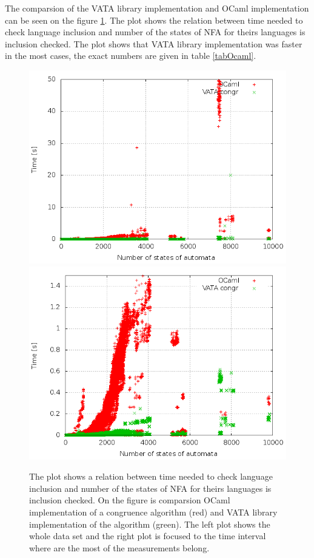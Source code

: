 The comparsion of the VATA library implementation and OCaml implementation can be seen on the figure \ref{figGraphOCaml}. The plot shows the relation between 
time needed to check language inclusion and number of the states of NFA for theirs languages is inclusion checked. The plot shows that VATA library
implementation was faster in the most cases, the exact numbers are given in table \ref{tabOcaml}.

\begin{figure}
\begin{center}
\includegraphics[scale=0.3]{fig/plot_hkc_zprava.png}
\includegraphics[scale=0.3]{fig/plot_hkc_step_zprava.png}
\label{figGraphOCaml}
\caption{The plot shows a relation between time needed to check language inclusion and number of the states of NFA for theirs languages is inclusion checked.
On the figure is comparsion OCaml implementation of a congruence algorithm (red) and VATA library implementation of the algorithm (green). The left plot shows
the whole data set and the right plot is focused to the time interval where are the most of the measurements belong.}
\end{center}
\end{figure}

